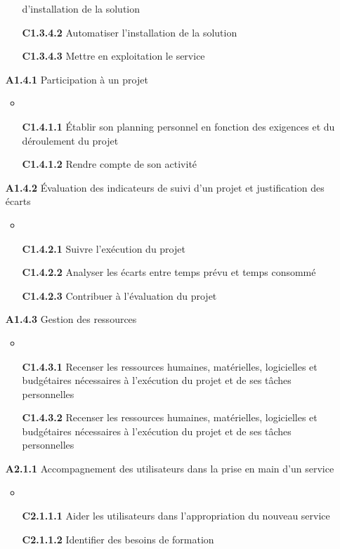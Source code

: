 \documentclass[12pt,a4paper,oneside,titlepage,final]{article}
\begin{document}
\begin{enumerate}
\begin{itemize}
    d'installation de la solution
    \item [\textbf{C1.3.4.2}] Automatiser l'installation de la
    solution
    \item [\textbf{C1.3.4.3}] Mettre en exploitation le service
  \end{itemize}
  \item [\textbf{A1.4.1}] Participation à un projet
  \begin{itemize}
    \item \item [\textbf{C1.4.1.1}] Établir son planning personnel en
    fonction des exigences et du déroulement du projet
    \item [\textbf{C1.4.1.2}] Rendre compte de son activité
  \end{itemize}
  \item [\textbf{A1.4.2}] Évaluation des indicateurs de suivi d'un
  projet et justification des écarts
  \begin{itemize}
    \item \item [\textbf{C1.4.2.1}] Suivre l'exécution du projet
    \item [\textbf{C1.4.2.2}] Analyser les écarts entre temps prévu et
    temps consommé
    \item [\textbf{C1.4.2.3}] Contribuer à l'évaluation du projet
  \end{itemize}
  \item [\textbf{A1.4.3}] Gestion des ressources
  \begin{itemize}
    \item \item [\textbf{C1.4.3.1}] Recenser les ressources humaines,
    matérielles, logicielles et budgétaires nécessaires à l'exécution
    du projet et de ses tâches personnelles
    \item [\textbf{C1.4.3.2}] Recenser les ressources humaines,
    matérielles, logicielles et budgétaires nécessaires à l'exécution
    du projet et de ses tâches personnelles
  \end{itemize}
  \item [\textbf{A2.1.1}] Accompagnement des utilisateurs dans la
  prise en main d'un service
  \begin{itemize}
    \item \item [\textbf{C2.1.1.1}] Aider les utilisateurs dans
    l'appropriation du nouveau service
    \item [\textbf{C2.1.1.2}] Identifier des besoins de formation

\end{itemize}
\end{enumerate}
\end{document}
